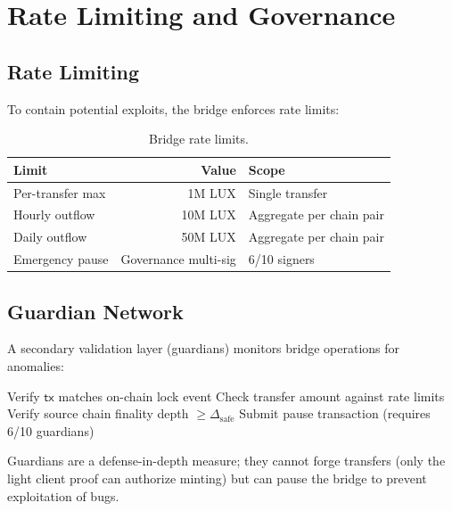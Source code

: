 \section{Rate Limiting and Governance}
\label{sec:governance}

\subsection{Rate Limiting}

To contain potential exploits, the bridge enforces rate limits:

\begin{table}[H]
\centering
\caption{Bridge rate limits.}
\label{tab:ratelimits}
\begin{tabular}{lrl}
\toprule
\textbf{Limit} & \textbf{Value} & \textbf{Scope} \\
\midrule
Per-transfer max & 1M LUX & Single transfer \\
Hourly outflow & 10M LUX & Aggregate per chain pair \\
Daily outflow & 50M LUX & Aggregate per chain pair \\
Emergency pause & Governance multi-sig & 6/10 signers \\
\bottomrule
\end{tabular}
\end{table}

\subsection{Guardian Network}

A secondary validation layer (guardians) monitors bridge operations for anomalies:

\begin{algorithm}[H]
\caption{Guardian Monitoring}
\label{alg:guardian}
\begin{algorithmic}[1]
    \State Verify $\mathsf{tx}$ matches on-chain lock event
    \State Check transfer amount against rate limits
    \State Verify source chain finality depth $\geq \Delta_{\text{safe}}$
        \State Submit pause transaction (requires 6/10 guardians)
    \EndIf
\EndFor
\end{algorithmic}
\end{algorithm}

Guardians are a defense-in-depth measure; they cannot forge transfers (only the light client proof can authorize minting) but can pause the bridge to prevent exploitation of bugs.

